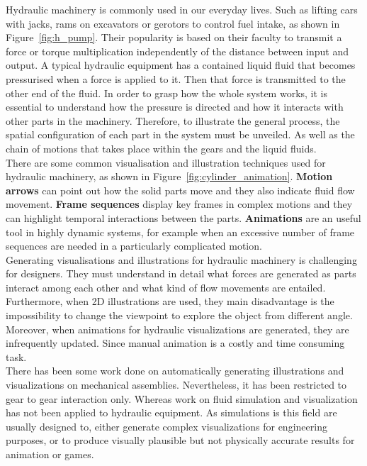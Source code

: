 \documentclass[11pt]{report}
\begin{document}
Hydraulic machinery is commonly used in our everyday lives.
Such as lifting cars with jacks, rams on excavators or gerotors to control fuel intake, as shown in Figure~\ref{fig:h_pump}.
Their popularity is based on their faculty to transmit a force or torque multiplication independently of the distance between input and output.  
A typical hydraulic equipment has a contained liquid fluid that becomes pressurised when a force is applied to it.
Then that force is transmitted to the other end of the fluid. 
In order to grasp how the whole system works, it is essential to understand how the pressure is directed and how it interacts with other parts in the machinery. 
Therefore, to illustrate the general process, the spatial configuration of each part in the system must be unveiled.
As well as the chain of motions that takes place within the gears and the liquid fluids.\\

There are some common visualisation and illustration techniques used for hydraulic machinery, as shown in Figure~\ref{fig:cylinder_animation}.
\textbf{Motion arrows} can point out how the solid parts move and they also indicate fluid flow movement.
\textbf{Frame sequences} display key frames in complex motions and they can highlight temporal interactions between the parts.
\textbf{Animations} are an useful tool in highly dynamic systems, for example when an excessive number of frame sequences are needed in a particularly complicated motion.\\

Generating visualisations and illustrations for hydraulic machinery is challenging for designers.
They must understand in detail what forces are generated as parts interact among each other and what kind of flow movements are entailed.
Furthermore, when 2D illustrations are used, they main disadvantage is the impossibility to change the viewpoint to explore the object from different angle.
Moreover, when animations for hydraulic visualizations are generated, they are infrequently updated. 
Since manual animation is a costly and time consuming task.\\

There has been some work done on automatically generating illustrations and visualizations on mechanical assemblies.
Nevertheless, it has been restricted to gear to gear interaction only.
Whereas work on fluid simulation and visualization has not been applied to hydraulic equipment.
As simulations is this field are usually designed to, either generate complex visualizations for engineering purposes, or to produce visually plausible but not physically accurate results for animation or games.\\
\end{document}
